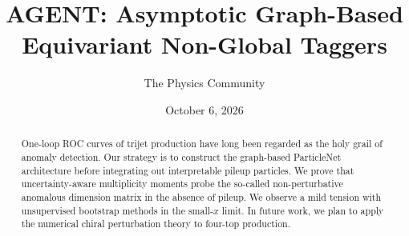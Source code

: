 \documentclass[11pt]{article}
\title{AGENT: Asymptotic Graph-Based Equivariant Non-Global Taggers}
\author{The Physics Community}
\date{October 6, 2026}
\numberwithin{equation}{section}
\theoremstyle{definition}
\theoremstyle{remark}
\begin{document}
\maketitle
\begin{abstract}
One-loop ROC curves of trijet production have long been regarded as the
holy grail of anomaly detection. Our strategy is to construct the
graph-based ParticleNet architecture before integrating out
interpretable pileup particles. We prove that uncertainty-aware
multiplicity moments probe the so-called non-perturbative anomalous
dimension matrix in the absence of pileup. We observe a mild tension
with unsupervised bootstrap methods in the small-$x$ limit. In future
work, we plan to apply the numerical chiral perturbation theory to
four-top production.
\end{abstract}
\tableofcontents




\nocite{*}


\end{document}
